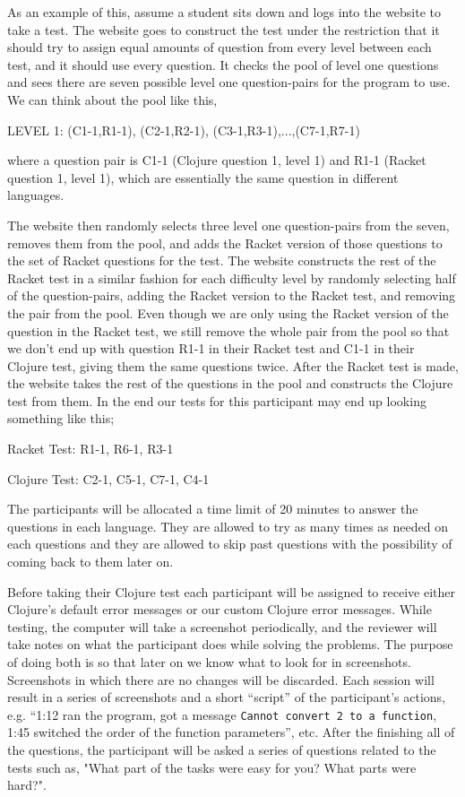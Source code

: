 \documentclass[12pt]{article}
\begin{document}
As an example of this, assume a student sits down and logs into the website to take a test.
The website goes to construct the test under the restriction that it should try to assign equal amounts of question from every level between each test, and it should use every question. 
It checks the pool of level one questions and sees there are seven possible level one question-pairs for the program to use.
We can think about the pool like this,

LEVEL 1: (C1-1,R1-1), (C2-1,R2-1), (C3-1,R3-1),...,(C7-1,R7-1)

where a question pair is C1-1 (Clojure question 1, level 1) and R1-1 (Racket question 1, level 1), which are essentially the same question in different languages.

The website then randomly selects three level one question-pairs from the seven, removes them from the pool, and adds the Racket version of those questions to the set of Racket questions for the test.
The website constructs the rest of the Racket test in a similar fashion for each difficulty level by randomly selecting half of the question-pairs, adding the Racket version to the  Racket test, and removing the pair from the pool.
Even though we are only using the Racket version of the question in the Racket test, we still remove the whole pair from the pool so that we don't end up with question R1-1 in their Racket test and C1-1 in their Clojure test, giving them the same questions twice. 
After the Racket test is made, the website takes the rest of the questions in the pool and constructs the Clojure test from them.
In the end our tests for this participant may end up looking something like this; 

Racket Test: R1-1, R6-1, R3-1

Clojure Test: C2-1, C5-1, C7-1, C4-1


	The participants will be allocated a time limit of 20 minutes to answer the questions in each language. 
They are allowed to try as many times as needed on each questions and they are allowed to skip past questions with the possibility of coming back to them later on. 

Before taking their Clojure test each participant will  be assigned to receive either Clojure's default error messages or our custom Clojure error messages.
While testing, the computer will take a screenshot periodically, and the reviewer will take notes on what the participant does while solving the problems.
The purpose of doing both is so that later on we know what to look for in screenshots. Screenshots in which there are no changes will be discarded. 
Each session will result in a series of screenshots and a short ``script'' of the participant's actions, e.g. ``1:12 ran the program, got a message \texttt{Cannot convert 2 to a function}, 1:45 switched the order of the function parameters'', etc.
After the finishing all of the questions, the participant will be asked a series of questions related to the tests such as, "What part of the tasks were easy for you? What parts were hard?".
\end{document}
